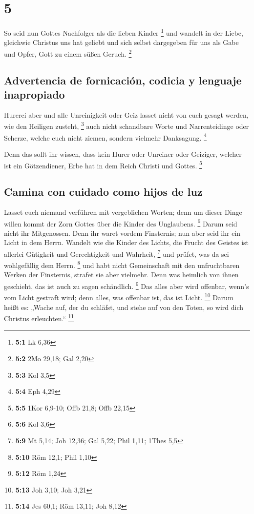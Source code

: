 \hypertarget{section-4}{%
\section{5}\label{section-4}}

 So seid nun Gottes Nachfolger als die lieben Kinder
\footnote{\textbf{5:1} Lk 6,36}  und wandelt in der Liebe,
gleichwie Christus uns hat geliebt und sich selbst dargegeben für uns
als Gabe und Opfer, Gott zu einem süßen Geruch. \footnote{\textbf{5:2}
  2Mo 29,18; Gal 2,20}

\hypertarget{advertencia-de-fornicaciuxf3n-codicia-y-lenguaje-inapropiado}{%
\subsection{Advertencia de fornicación, codicia y lenguaje
inapropiado}\label{advertencia-de-fornicaciuxf3n-codicia-y-lenguaje-inapropiado}}

 Hurerei aber und alle Unreinigkeit oder Geiz lasset nicht
von euch gesagt werden, wie den Heiligen zusteht, \footnote{\textbf{5:3}
  Kol 3,5}  auch nicht schandbare Worte und Narrenteidinge
oder Scherze, welche euch nicht ziemen, sondern vielmehr Danksagung.
\footnote{\textbf{5:4} Eph 4,29}

 Denn das sollt ihr wissen, dass kein Hurer oder Unreiner
oder Geiziger, welcher ist ein Götzendiener, Erbe hat in dem Reich
Christi und Gottes. \footnote{\textbf{5:5} 1Kor 6,9-10; Offb 21,8; Offb
  22,15}

\hypertarget{camina-con-cuidado-como-hijos-de-luz}{%
\subsection{Camina con cuidado como hijos de
luz}\label{camina-con-cuidado-como-hijos-de-luz}}

 Lasset euch niemand verführen mit vergeblichen Worten;
denn um dieser Dinge willen kommt der Zorn Gottes über die Kinder des
Unglaubens. \footnote{\textbf{5:6} Kol 3,6}  Darum seid
nicht ihr Mitgenossen.  Denn ihr waret vordem Finsternis;
nun aber seid ihr ein Licht in dem Herrn.  Wandelt wie die
Kinder des Lichts, die Frucht des Geistes ist allerlei Gütigkeit und
Gerechtigkeit und Wahrheit, \footnote{\textbf{5:9} Mt 5,14; Joh 12,36;
  Gal 5,22; Phil 1,11; 1Thes 5,5}  und prüfet, was da sei
wohlgefällig dem Herrn. \footnote{\textbf{5:10} Röm 12,1; Phil 1,10}
 und habt nicht Gemeinschaft mit den unfruchtbaren Werken
der Finsternis, strafet sie aber vielmehr.  Denn was
heimlich von ihnen geschieht, das ist auch zu sagen schändlich.
\footnote{\textbf{5:12} Röm 1,24}  Das alles aber wird
offenbar, wenn's vom Licht gestraft wird; denn alles, was offenbar ist,
das ist Licht. \footnote{\textbf{5:13} Joh 3,10; Joh 3,21}
 Darum heißt es: „Wache auf, der du schläfst, und stehe
auf von den Toten, so wird dich Christus erleuchten.`` \footnote{\textbf{5:14}
  Jes 60,1; Röm 13,11; Joh 8,12}


